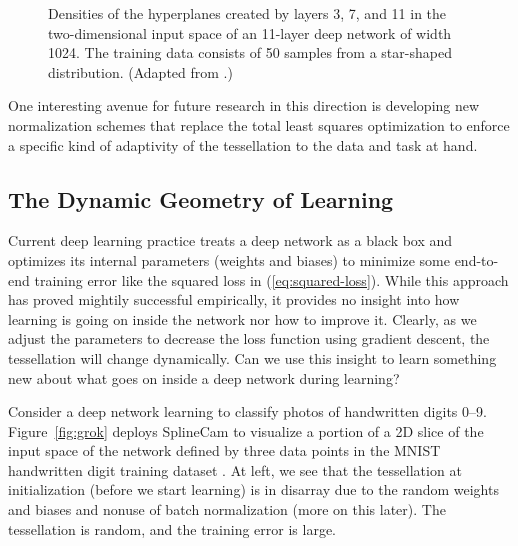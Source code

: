 \documentclass{notices}
\begin{document}
\begin{figure}[h]
    \caption{\small
Densities of the hyperplanes created by layers 3, 7, and 11 in the two-dimensional input space of an 11-layer deep network of width 1024.
The training data consists of 50 samples from a star-shaped distribution.
(Adapted from \cite{BN-arxiv}.)
  }
\label{fig:BN2}
\end{figure}

One interesting avenue for future research in this direction is developing new normalization schemes that replace the total least squares optimization to enforce a specific kind of adaptivity of the tessellation to the data and task at hand.





\subsection*{The Dynamic Geometry of Learning}


Current deep learning practice treats a deep network as a black box and optimizes its internal parameters (weights and biases) to minimize some end-to-end training error like the squared loss in (\ref{eq:squared-loss}).
While this approach has proved mightily successful empirically, it provides no insight into how learning is going on inside the network nor how to improve it.
Clearly, as we adjust the parameters to decrease the loss function using gradient descent, the tessellation will change dynamically.
Can we use this insight to learn something new about what goes on inside a deep network during learning?

Consider a deep network learning to classify photos of handwritten digits 0--9.
Figure~\ref{fig:grok} deploys SplineCam to visualize a portion of a 2D slice of the input space of the network defined by three data points in the MNIST handwritten digit training dataset \cite{alwaysgrok}.
At left, we see that the tessellation at initialization (before we start learning) is in disarray due to the random weights and biases and nonuse of batch normalization (more on this later).
The tessellation is random, and the training error is large.
\end{document}
